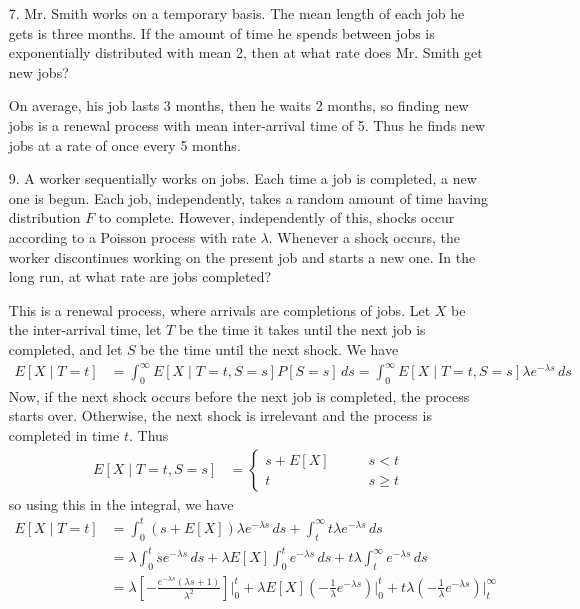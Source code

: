 \documentclass{article}
\begin{document}
\begin{itemize}
	\item[7.] Mr. Smith works on a temporary basis. The mean length of each job he gets is three months. If the amount of time he spends between jobs is exponentially distributed with mean 2, then at what rate does Mr. Smith get new jobs?
		\begin{soln}
			On average, his job lasts 3 months, then he waits 2 months, so finding new jobs is a renewal process with mean inter-arrival time of 5. Thus he finds new jobs at a rate of once every 5 months.
		\end{soln}

	\item[9.] A worker sequentially works on jobs. Each time a job is completed, a new one is begun. Each job, independently, takes a random amount of time having distribution $F$ to complete. However, independently of this, shocks occur according to a Poisson process with rate $\lambda.$ Whenever a shock occurs, the worker discontinues working on the present job and starts a new one. In the long run, at what rate are jobs completed?
		\begin{soln}
			This is a renewal process, where arrivals are completions of jobs. Let $X$ be the inter-arrival time, let $T$ be the time it takes until the next job is completed, and let $S$ be the time until the next shock. We have
			\begin{align*}
				E[X\mid T=t] &= \int_0^\infty E[X\mid T=t, S=s] P[S=s]\, ds = \int_0^\infty E[X\mid T=t, S=s] \lambda e^{-\lambda s}\, ds
			\end{align*}
			Now, if the next shock occurs before the next job is completed, the process starts over. Otherwise, the next shock is irrelevant and the process is completed in time $t.$ Thus
			\begin{align*}
				E[X\mid T=t, S=s] &= \begin{cases}
					s+E[X] \quad\quad & s<t \\
					t \quad\quad\quad & s\ge t
				\end{cases}
			\end{align*}
			so using this in the integral, we have
			\begin{align*}
				E[X\mid T=t] &= \int_0^t (s+E[X]) \lambda e^{-\lambda s}\, ds + \int_t^\infty t\lambda e^{-\lambda s}\, ds \\
				&= \lambda\int_0^t se^{-\lambda s}\, ds + \lambda E[X] \int_0^t e^{-\lambda s}\, ds + t\lambda\int_t^\infty e^{-\lambda s}\, ds \\
				&= \lambda\left[ -\frac{e^{-\lambda s}(\lambda s+1)}{\lambda^2} \right]\bigg\vert_0^t + \lambda E[X] \left( -\frac{1}{\lambda} e^{-\lambda s} \right)\bigg\vert_0^t + t\lambda\left( -\frac{1}{\lambda} e^{-\lambda s} \right)\bigg\vert_t^\infty \\

\end{align*}
\end{soln}
\end{itemize}
\end{document}
